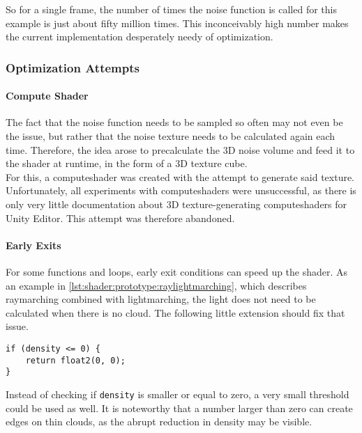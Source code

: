 \noindent
So for a single frame, the number of times the noise function is called for this example is just about fifty million times. This inconceivably high number makes the current implementation desperately needy of optimization.

\subsubsection{Optimization Attempts}
\paragraph{Compute Shader}
The fact that the noise function needs to be sampled so often may not even be the issue, but rather that the noise texture needs to be calculated again each time.
Therefore, the idea arose to precalculate the 3D noise volume and feed it to the shader at runtime, in the form of a 3D texture cube.
\\
For this, a \gls{computeshader} was created with the attempt to generate said texture.
Unfortunately, all experiments with \gls{computeshader}s were unsuccessful, as there is only very little documentation about 3D texture-generating \gls{computeshader}s for Unity Editor.
This attempt was therefore abandoned.

\paragraph{Early Exits}
For some functions and loops, early exit conditions can speed up the shader. As an example in \autoref{lst:shader:prototype:raylightmarching}, which describes \gls{raymarching} combined with \gls{lightmarching}, the light does not need to be calculated when there is no cloud.
The following little extension should fix that issue.
\begin{lstlisting}[language=HLSL]
if (density <= 0) {
    return float2(0, 0);
}
\end{lstlisting}

\noindent
Instead of checking if \lstinline[language=HLSL]{density} is smaller or equal to zero, a very small threshold could be used as well.
It is noteworthy that a number larger than zero can create edges on thin clouds, as the abrupt reduction in density may be visible.